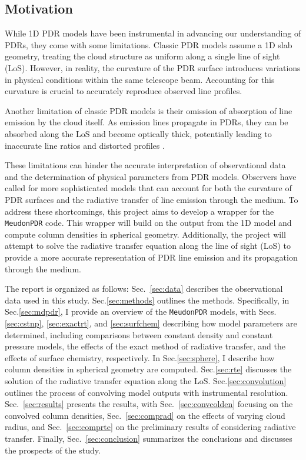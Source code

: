 \documentclass[12pt,a4paper]{article}
\newcommand{\mdpdr}{\texttt{MeudonPDR} code}
\begin{document}

\subsection{Motivation}
While 1D PDR models have been instrumental in advancing our understanding of PDRs, they come with some limitations. Classic PDR models assume a 1D slab geometry, treating the cloud structure as uniform along a single line of sight (LoS). However, in reality, the curvature of the PDR surface introduces variations in physical conditions within the same telescope beam. Accounting for this curvature is crucial to accurately reproduce observed line profiles.

Another limitation of classic PDR models is their omission of absorption of line emission by the cloud itself. As emission lines propagate in PDRs, they can be absorbed along the LoS and become optically thick, potentially leading to inaccurate line ratios and distorted profiles \parencite{Abel2007,Guevara2020}.

These limitations can hinder the accurate interpretation of observational data and the determination of physical parameters from PDR models. Observers have called for more sophisticated models that can account for both the curvature of PDR surfaces and the radiative transfer of line emission through the medium. To address these shortcomings, this project aims to develop a wrapper for the \mdpdr{}. This wrapper will build on the output from the 1D model and compute column densities in spherical geometry. Additionally, the project will attempt to solve the radiative transfer equation along the line of sight (LoS) to provide a more accurate representation of PDR line emission and its propagation through the medium.

The report is organized as follows: Sec.~\ref{sec:data} describes the observational data used in this study. Sec.\ref{sec:methods} outlines the methods. Specifically, in Sec.\ref{sec:mdpdr}, I provide an overview of the \texttt{MeudonPDR} models, with Secs.\ref{sec:cstnp}, \ref{sec:exactrt}, and \ref{sec:surfchem} describing how model parameters are determined, including comparisons between constant density and constant pressure models, the effects of the exact method of radiative transfer, and the effects of surface chemistry, respectively. In Sec.\ref{sec:sphere}, I describe how column densities in spherical geometry are computed. Sec.\ref{sec:rte} discusses the solution of the radiative transfer equation along the LoS. Sec.\ref{sec:convolution} outlines the process of convolving model outputs with instrumental resolution. Sec.~\ref{sec:results} presents the results, with Sec.~\ref{sec:convcolden} focusing on the convolved column densities, Sec.~\ref{sec:comprad} on the effects of varying cloud radius, and Sec.~\ref{sec:comprte} on the preliminary results of considering radiative transfer. Finally, Sec.~\ref{sec:conclusion} summarizes the conclusions and discusses the prospects of the study.
\end{document}
